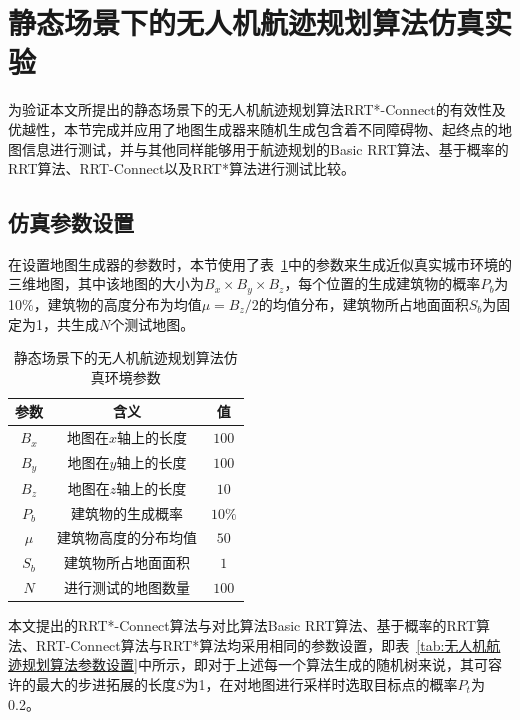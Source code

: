 \section{静态场景下的无人机航迹规划算法仿真实验}

为验证本文所提出的静态场景下的无人机航迹规划算法RRT*-Connect的有效性及优越性，本节完成并应用了地图生成器来随机生成包含着不同障碍物、起终点的地图信息进行测试，并与其他同样能够用于航迹规划的Basic RRT算法、基于概率的RRT算法、RRT-Connect以及RRT*算法进行测试比较。

\subsection{仿真参数设置}

在设置地图生成器的参数时，本节使用了表~\ref{tab:航迹规划算法仿真环境参数}中的参数来生成近似真实城市环境的三维地图，其中该地图的大小为\( B_x \times B_y \times B_z \)，每个位置的生成建筑物的概率\( P_b \)为10\%，建筑物的高度分布为均值\( \mu = B_z / 2\)的均值分布，建筑物所占地面面积\( S_b \)为固定为1，共生成\( N \)个测试地图。

\begin{table}[!htbp]
    \caption{静态场景下的无人机航迹规划算法仿真环境参数}
    \label{tab:航迹规划算法仿真环境参数}
    \centering
    \begin{tabular}{c c c}
        \toprule
        \textbf{参数} & \textbf{含义} & \textbf{值}\\
        \midrule
        \(B_x\) & 地图在\(x\)轴上的长度 & \(100\) \\
        \(B_y\) & 地图在\(y\)轴上的长度 & \(100\) \\
        \(B_z\) & 地图在\(z\)轴上的长度 & \(10\) \\
        \(P_b\) & 建筑物的生成概率 & \(10\%\)\\
        \( \mu \) & 建筑物高度的分布均值 & \(50\) \\
        \( S_b \) & 建筑物所占地面面积 & \(1\) \\
        \(N\) & 进行测试的地图数量 & \(100\) \\
        \bottomrule
    \end{tabular}
\end{table}

本文提出的RRT*-Connect算法与对比算法Basic RRT算法、基于概率的RRT算法、RRT-Connect算法与RRT*算法均采用相同的参数设置，即表~\ref{tab:无人机航迹规划算法参数设置}中所示，即对于上述每一个算法生成的随机树来说，其可容许的最大的步进拓展的长度\(S\)为1，在对地图进行采样时选取目标点的概率\(P_t\)为0.2。

